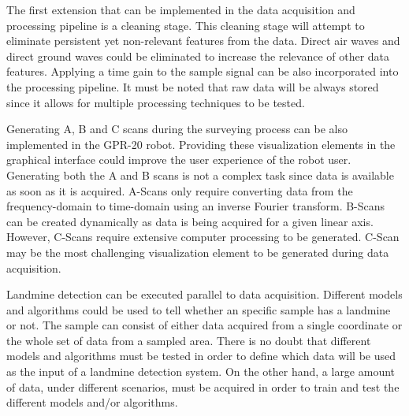 \documentclass{article}
\begin{document}
The first extension that can be implemented in the data acquisition and processing pipeline is a cleaning stage. This cleaning stage will attempt to eliminate persistent yet non-relevant features from the data. Direct air waves and direct ground waves could be eliminated to increase the relevance of other data features. Applying a time gain to the sample signal can be also incorporated into the processing pipeline. It must be noted that raw data will be always stored since it allows for multiple processing techniques to be tested.

Generating A, B and C scans during the surveying process can be also implemented in the GPR-20 robot. Providing these visualization elements in the graphical interface could improve the user experience of the robot user. Generating both the A and B scans is not a complex task since data is available as soon as it is acquired. A-Scans only require converting data from the frequency-domain to time-domain using an inverse Fourier transform. B-Scans can be created dynamically as data is being acquired for a given linear axis. However, C-Scans require extensive computer processing to be generated. C-Scan may be the most challenging visualization element to be generated during data acquisition.

Landmine detection can be executed parallel to data acquisition. Different models and algorithms could be used to tell whether an specific sample has a landmine or not. The sample can consist of either data acquired from a single coordinate or the whole set of data from a sampled area. There is no doubt that different models and algorithms must be tested in order to define which data will be used as the input of a landmine detection system. On the other hand, a large amount of data, under different scenarios, must be acquired in order to train and test the different models and/or algorithms. 
\end{document}
